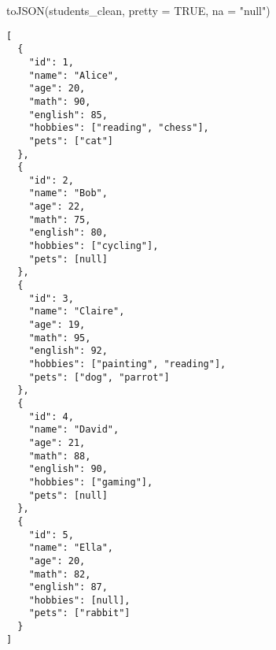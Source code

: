 \documentclass[
  letterpaper,
  DIV=11,
  numbers=noendperiod]{scrreprt}
\newenvironment{Shaded}{\begin{snugshade}}{\end{snugshade}}
\newcommand{\AttributeTok}[1]{\textcolor[rgb]{0.40,0.45,0.13}{#1}}
\newcommand{\ConstantTok}[1]{\textcolor[rgb]{0.56,0.35,0.01}{#1}}
\newcommand{\FunctionTok}[1]{\textcolor[rgb]{0.28,0.35,0.67}{#1}}
\newcommand{\NormalTok}[1]{\textcolor[rgb]{0.00,0.23,0.31}{#1}}
\newcommand{\StringTok}[1]{\textcolor[rgb]{0.13,0.47,0.30}{#1}}
\begin{document}
\begin{Shaded}
\begin{Highlighting}[]
\FunctionTok{toJSON}\NormalTok{(students\_clean, }\AttributeTok{pretty =} \ConstantTok{TRUE}\NormalTok{, }\AttributeTok{na =} \StringTok{"null"}\NormalTok{)}
\end{Highlighting}
\end{Shaded}

\begin{verbatim}
[
  {
    "id": 1,
    "name": "Alice",
    "age": 20,
    "math": 90,
    "english": 85,
    "hobbies": ["reading", "chess"],
    "pets": ["cat"]
  },
  {
    "id": 2,
    "name": "Bob",
    "age": 22,
    "math": 75,
    "english": 80,
    "hobbies": ["cycling"],
    "pets": [null]
  },
  {
    "id": 3,
    "name": "Claire",
    "age": 19,
    "math": 95,
    "english": 92,
    "hobbies": ["painting", "reading"],
    "pets": ["dog", "parrot"]
  },
  {
    "id": 4,
    "name": "David",
    "age": 21,
    "math": 88,
    "english": 90,
    "hobbies": ["gaming"],
    "pets": [null]
  },
  {
    "id": 5,
    "name": "Ella",
    "age": 20,
    "math": 82,
    "english": 87,
    "hobbies": [null],
    "pets": ["rabbit"]
  }
] 
\end{verbatim}
\end{document}
